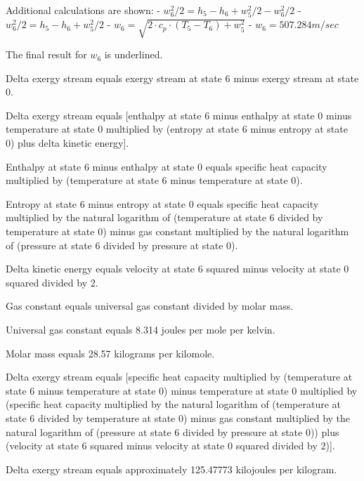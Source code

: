Additional calculations are shown:  
- \( w_6^2 / 2 = h_5 - h_6 + w_5^2 / 2 - w_6^2 / 2 \)  
- \( w_6^2 / 2 = h_5 - h_6 + w_5^2 / 2 \)  
- \( w_6 = \sqrt{2 \cdot c_p \cdot (T_5 - T_6) + w_5^2} \)  
- \( w_6 = 507.284 m/sec \)  

The final result for \( w_6 \) is underlined.

Delta exergy stream equals exergy stream at state 6 minus exergy stream at state 0.  

Delta exergy stream equals [enthalpy at state 6 minus enthalpy at state 0 minus temperature at state 0 multiplied by (entropy at state 6 minus entropy at state 0) plus delta kinetic energy].  

Enthalpy at state 6 minus enthalpy at state 0 equals specific heat capacity multiplied by (temperature at state 6 minus temperature at state 0).  

Entropy at state 6 minus entropy at state 0 equals specific heat capacity multiplied by the natural logarithm of (temperature at state 6 divided by temperature at state 0) minus gas constant multiplied by the natural logarithm of (pressure at state 6 divided by pressure at state 0).  

Delta kinetic energy equals velocity at state 6 squared minus velocity at state 0 squared divided by 2.  

Gas constant equals universal gas constant divided by molar mass.  

Universal gas constant equals 8.314 joules per mole per kelvin.  

Molar mass equals 28.57 kilograms per kilomole.  

Delta exergy stream equals [specific heat capacity multiplied by (temperature at state 6 minus temperature at state 0) minus temperature at state 0 multiplied by (specific heat capacity multiplied by the natural logarithm of (temperature at state 6 divided by temperature at state 0) minus gas constant multiplied by the natural logarithm of (pressure at state 6 divided by pressure at state 0)) plus (velocity at state 6 squared minus velocity at state 0 squared divided by 2)].  

Delta exergy stream equals approximately 125.47773 kilojoules per kilogram.